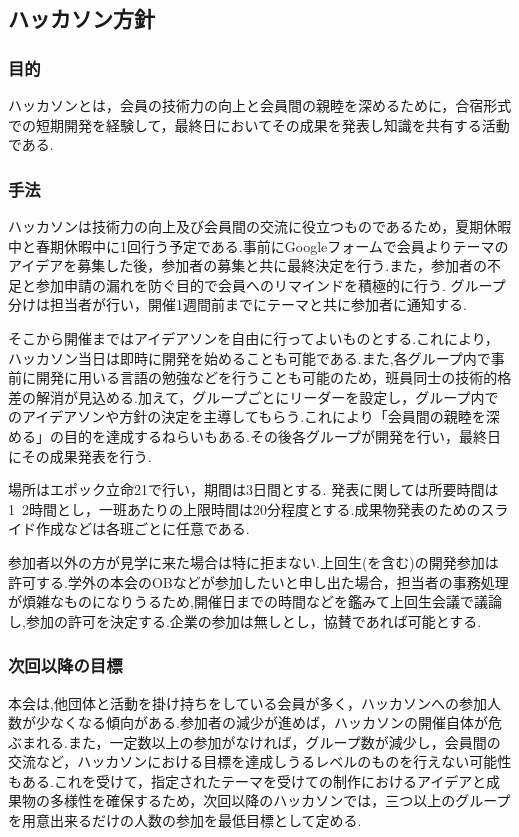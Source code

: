 \subsection*{ハッカソン方針}

\subsubsection*{目的}
ハッカソンとは，会員の技術力の向上と会員間の親睦を深めるために，合宿形式での短期開発を経験して，最終日においてその成果を発表し知識を共有する活動である.


\subsubsection*{手法}
ハッカソンは技術力の向上及び会員間の交流に役立つものであるため，夏期休暇中と春期休暇中に1回行う予定である.事前にGoogleフォームで会員よりテーマのアイデアを募集した後，参加者の募集と共に最終決定を行う.また，参加者の不足と参加申請の漏れを防ぐ目的で会員へのリマインドを積極的に行う.
グループ分けは担当者が行い，開催1週間前までにテーマと共に参加者に通知する.

そこから開催まではアイデアソンを自由に行ってよいものとする.これにより，ハッカソン当日は即時に開発を始めることも可能である.また,各グループ内で事前に開発に用いる言語の勉強などを行うことも可能のため，班員同士の技術的格差の解消が見込める.加えて，グループごとにリーダーを設定し，グループ内でのアイデアソンや方針の決定を主導してもらう.これにより「会員間の親睦を深める」の目的を達成するねらいもある.その後各グループが開発を行い，最終日にその成果発表を行う.

場所はエポック立命21で行い，期間は3日間とする.
発表に関しては所要時間は1~2時間とし，一班あたりの上限時間は20分程度とする.成果物発表のためのスライド作成などは各班ごとに任意である.

参加者以外の方が見学に来た場合は特に拒まない.上回生(\fourthGrade を含む)の開発参加は許可する.学外の本会のOBなどが参加したいと申し出た場合，担当者の事務処理が煩雑なものになりうるため,開催日までの時間などを鑑みて上回生会議で議論し,参加の許可を決定する.企業の参加は無しとし，協賛であれば可能とする.



\subsubsection*{次回以降の目標}
本会は,他団体と活動を掛け持ちをしている会員が多く，ハッカソンへの参加人数が少なくなる傾向がある.参加者の減少が進めば，ハッカソンの開催自体が危ぶまれる.また，一定数以上の参加がなければ，グループ数が減少し，会員間の交流など，ハッカソンにおける目標を達成しうるレベルのものを行えない可能性もある.これを受けて，指定されたテーマを受けての制作におけるアイデアと成果物の多様性を確保するため，次回以降のハッカソンでは，三つ以上のグループを用意出来るだけの人数の参加を最低目標として定める.
